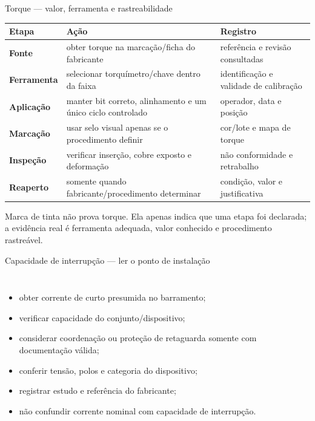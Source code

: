 \begin{frame}{Torque — valor, ferramenta e rastreabilidade}
\scriptsize
\begin{tabularx}{\textwidth}{>{\bfseries}p{2.6cm}X X}
\toprule
Etapa & Ação & Registro \\
\midrule
Fonte & obter torque na marcação/ficha do fabricante & referência e revisão consultadas \\
Ferramenta & selecionar torquímetro/chave dentro da faixa & identificação e validade de calibração \\
Aplicação & manter bit correto, alinhamento e um único ciclo controlado & operador, data e posição \\
Marcação & usar selo visual apenas se o procedimento definir & cor/lote e mapa de torque \\
Inspeção & verificar inserção, cobre exposto e deformação & não conformidade e retrabalho \\
Reaperto & somente quando fabricante/procedimento determinar & condição, valor e justificativa \\
\bottomrule
\end{tabularx}
\begin{caixaAt}
Marca de tinta não prova torque. Ela apenas indica que uma etapa foi declarada; a evidência real é ferramenta adequada, valor conhecido e procedimento rastreável.
\end{caixaAt}
\end{frame}

\begin{frame}{Capacidade de interrupção — ler o ponto de instalação}
\small
\begin{columns}[T,onlytextwidth]
\begin{itemize}
\item obter corrente de curto presumida no barramento;
\item verificar capacidade do conjunto/dispositivo;
\item considerar coordenação ou proteção de retaguarda somente com documentação válida;
\item conferir tensão, polos e categoria do dispositivo;
\item registrar estudo e referência do fabricante;
\item não confundir corrente nominal com capacidade de interrupção.
\end{itemize}
\end{columns}
\end{frame}

